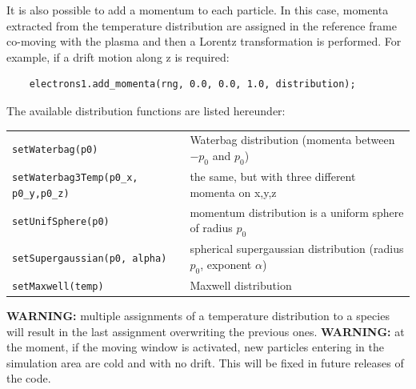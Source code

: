 \documentclass[11pt,a4paper]{report}
\begin{document}
It is also possible to add a momentum to each particle. In this case, momenta extracted from the temperature distribution are assigned in the reference frame co-moving with the plasma and then a Lorentz transformation is performed.   For example, if a drift motion along z is required:
\begin{lstlisting}
	electrons1.add_momenta(rng, 0.0, 0.0, 1.0, distribution);
\end{lstlisting}
The available distribution functions are listed hereunder:
\begin{center}
    \begin{tabular}{ l | l }
    	\verb+setWaterbag(p0)+ & Waterbag distribution (momenta between $-p_0$ and $p_0$)\\
    	\verb+setWaterbag3Temp(p0_x, p0_y,p0_z)+ & the same, but with three different momenta on x,y,z\\
    	\verb+setUnifSphere(p0)+ & momentum distribution is a uniform sphere of radius $p_0$\\
    	\verb+setSupergaussian(p0, alpha)+ & spherical supergaussian distribution (radius $p_0$, exponent $\alpha$)\\
    	\verb+setMaxwell(temp)+ & Maxwell distribution \\
    \end{tabular}
\end{center}
\textbf{WARNING: } multiple assignments of a temperature distribution to a species will result in the last assignment overwriting the previous ones.
\textbf{WARNING: } at the moment, if the moving window is activated, new particles entering in the simulation area are cold and with no drift. This will be fixed in future releases of the code.
\end{document}
